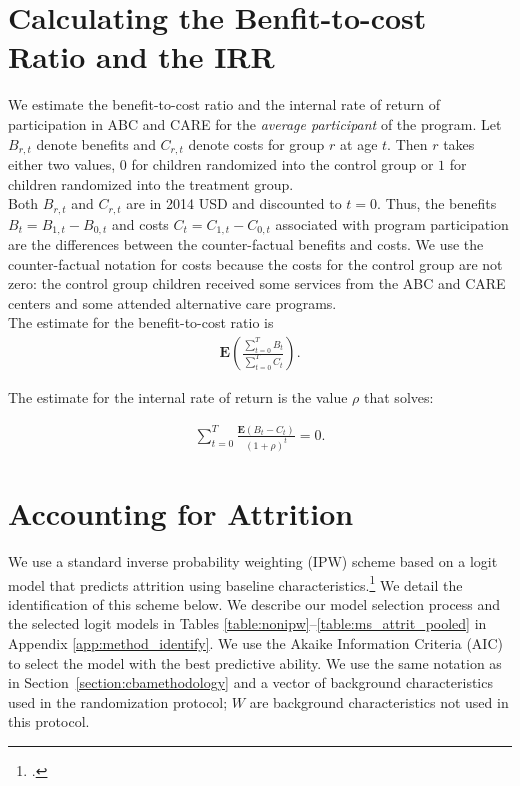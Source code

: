 \begin{appendices}
\section{Calculating the Benfit-to-cost Ratio and the IRR}

\noindent We estimate the benefit-to-cost ratio and the  internal rate of return of participation in ABC and CARE for the \textit{average participant} of the program. Let $B_{r,t}$ denote benefits and  $C_{r,t}$ denote costs for group $r$ at age $t$. Then $r$ takes either two values, $0$ for children randomized into the control group or $1$ for children randomized into the treatment group.\\ 

\noindent Both $B_{r,t}$ and $C_{r,t}$ are in 2014 USD and discounted to $t = 0$. Thus, the benefits $B_t = B_{1,t} - B_{0,t}$ and costs $C_t = C_{1,t} - C_{0,t}$ associated with program participation are the differences between the counter-factual benefits and costs. We use the counter-factual notation for costs because the costs for the control group are not zero: the control group children received some services from the ABC and CARE centers and some attended alternative care programs. \\

\noindent The estimate for the benefit-to-cost ratio is
\begin{align}
\mathbf{E} \left( \frac{ \sum_{t=0}^T B_t}{\sum_{t=0}^T C_t} \right).
\end{align}

\noindent The estimate for the internal rate of return is the value $\rho$ that solves:

\begin{align}
\sum_{t=0}^T \frac{ \mathbf{E} (B_t - C_t)}{(1+\rho)^t} = 0.
\end{align}

\setcounter{figure}{0}  \renewcommand{\thefigure}{G.\arabic{figure}}
\setcounter{table}{0}   \renewcommand{\thetable}{G.\arabic{table}}

\section{Accounting for Attrition} \label{appendix:attrition}

\noindent We use a standard inverse probability weighting (IPW) scheme based on a logit model that predicts attrition using baseline characteristics.\footnote{\citet{Horvitz_Thompson_1952_JASA}.} We detail the identification of this scheme below. We describe our model selection process and the selected logit models in Tables \ref{table:nonipw}--\ref{table:ms_attrit_pooled} in Appendix \ref{app:method_identify}. We use the Akaike Information Criteria (AIC) to select the model with the best predictive ability. We use the same notation as in Section~\ref{section:cbamethodology} and a vector of background characteristics used in the randomization protocol; $W$ are background characteristics not used in this protocol.\\


\end{appendices}
